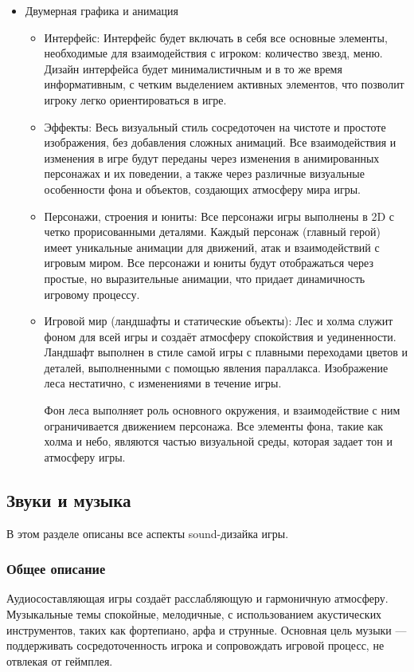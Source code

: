 \documentclass{article}
\begin{document}
\begin{itemize}
    \item Двумерная графика и анимация
    \begin{itemize}
        \item Интерфейс:
        Интерфейс будет включать в себя все основные элементы, необходимые для взаимодействия с игроком: количество звезд, меню. Дизайн интерфейса будет минималистичным и в то же время информативным, с четким выделением активных элементов, что позволит игроку легко ориентироваться в игре.
        \item Эффекты:
        Весь визуальный стиль сосредоточен на чистоте и простоте изображения, без добавления сложных анимаций. Все взаимодействия и изменения в игре будут переданы через изменения в анимированных персонажах и их поведении, а также через различные визуальные особенности фона и объектов, создающих атмосферу мира игры.
        \item Персонажи, строения и юниты:
        Все персонажи игры выполнены в 2D с четко прорисованными деталями. Каждый персонаж (главный герой) имеет уникальные анимации для движений, атак и взаимодействий с игровым миром. Все персонажи и юниты будут отображаться через простые, но выразительные анимации, что придает динамичность игровому процессу.
        \item Игровой мир (ландшафты и статические объекты):
        Лес и холма служит фоном для всей игры и создаёт атмосферу спокойствия и уединенности. Ландшафт выполнен в стиле самой игры с плавными переходами цветов и деталей, выполненными с помощью явления параллакса. Изображение леса нестатично, с изменениями в течение игры.
        
        Фон леса выполняет роль основного окружения, и взаимодействие с ним ограничивается движением персонажа. Все элементы фона, такие как холма и небо, являются частью визуальной среды, которая задает тон и атмосферу игры.
    \end{itemize}
\end{itemize}

\subsection{Звуки и музыка}
В этом разделе описаны все аспекты sound-дизайка игры.

\subsubsection{Общее описание}
Аудиосоставляющая игры создаёт расслабляющую и гармоничную атмосферу. Музыкальные темы спокойные, мелодичные, с использованием акустических инструментов, таких как фортепиано, арфа и струнные. Основная цель музыки — поддерживать сосредоточенность игрока и сопровождать игровой процесс, не отвлекая от геймплея.
\end{document}
